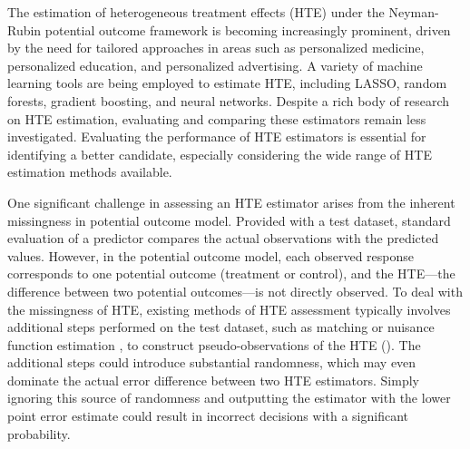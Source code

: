 \documentclass{article}
\newcommand{\zg}[1]{{\color{blue} [ZG: #1]}}
\theoremstyle{plain}
\theoremstyle{definition}
\theoremstyle{plain}
\begin{document}
The estimation of heterogeneous treatment effects (HTE) under the Neyman-Rubin potential outcome framework is becoming increasingly prominent, driven by the need for tailored approaches in areas such as personalized medicine, personalized education, and personalized advertising. 
A variety of machine learning tools are being employed to estimate HTE, including LASSO, random forests, gradient boosting, and neural networks. 
Despite a rich body of research on HTE estimation, evaluating and comparing these estimators remain less investigated.
Evaluating the performance of HTE estimators is essential for identifying a better candidate, especially considering the wide range of HTE estimation methods available.


One significant challenge in assessing an HTE estimator arises from the inherent missingness in potential outcome model.
Provided with a test dataset, standard evaluation of a predictor compares the actual observations with the predicted values.
However, in the potential outcome model, each observed response corresponds to one potential outcome (treatment or control), and the HTE---the difference between two potential outcomes---is not directly observed.
To deal with the missingness of HTE, existing methods of HTE assessment typically involves additional steps performed on the test dataset, such as matching \parencite{rolling2014model} or nuisance function estimation \parencite{alaa2019validating}, to construct pseudo-observations of the HTE (). 
The additional steps could introduce substantial randomness, which may even dominate the actual error difference between two HTE estimators.
Simply ignoring this source of randomness and outputting the estimator with the lower point error estimate could result in incorrect decisions with a significant probability.
\end{document}
